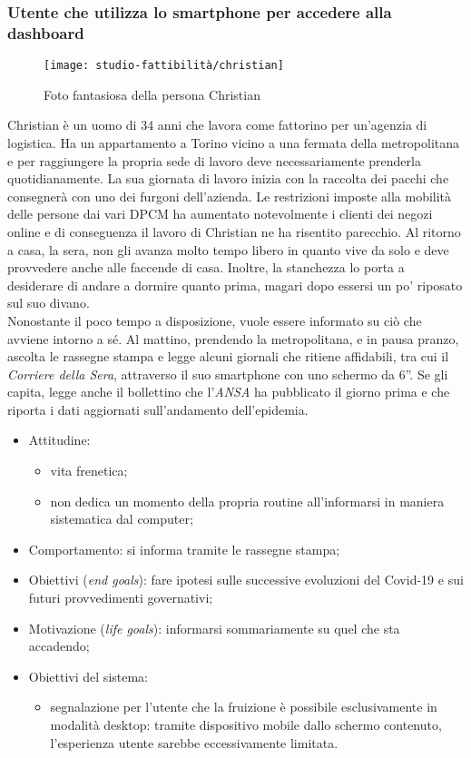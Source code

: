 \subsubsection{Utente che utilizza lo smartphone per accedere alla dashboard}
\begin{wrapfigure}{l}{7cm}
    \texttt{[image: studio-fattibilità/christian]}
    \caption{Foto fantasiosa della persona Christian}
\end{wrapfigure}
Christian è un uomo di 34 anni che lavora come fattorino per un'agenzia di logistica. Ha un appartamento a Torino vicino a una fermata della metropolitana e per raggiungere la propria sede di lavoro deve necessariamente prenderla quotidianamente. La sua giornata di lavoro inizia con la raccolta dei pacchi che consegnerà con uno dei furgoni dell'azienda. Le restrizioni imposte alla mobilità delle persone dai vari DPCM ha aumentato notevolmente i clienti dei negozi online e di conseguenza il lavoro di Christian ne ha risentito parecchio. Al ritorno a casa, la sera, non gli avanza molto tempo libero in quanto vive da solo e deve provvedere anche alle faccende di casa. Inoltre, la stanchezza lo porta a desiderare di andare a dormire quanto prima, magari dopo essersi un po' riposato sul suo divano.\\
Nonostante il poco tempo a disposizione, vuole essere informato su ciò che avviene intorno a sé. Al mattino, prendendo la metropolitana, e in pausa pranzo, ascolta le rassegne stampa e legge alcuni giornali che ritiene affidabili, tra cui il \textit{Corriere della Sera}, attraverso il suo smartphone con uno schermo da 6''. Se gli capita, legge anche il bollettino che l'\textit{ANSA} ha pubblicato il giorno prima e che riporta i dati aggiornati sull'andamento dell'epidemia.
\begin{itemize}
	\item Attitudine:
    \begin{itemize}
        \item vita frenetica;
        \item non dedica un momento della propria routine all'informarsi in maniera sistematica dal computer;
    \end{itemize}
    \item Comportamento: si informa tramite le rassegne stampa;
    \item Obiettivi (\textit{end goals}): fare ipotesi sulle successive evoluzioni del Covid-19 e sui futuri provvedimenti governativi;
    \item Motivazione (\textit{life goals}): informarsi sommariamente su quel che sta accadendo;
    \item Obiettivi del sistema:
    \begin{itemize}
        \item segnalazione per l'utente che la fruizione è possibile esclusivamente in modalità desktop: tramite dispositivo mobile dallo schermo contenuto, l'esperienza utente sarebbe eccessivamente limitata. 
    \end{itemize}
\end{itemize}